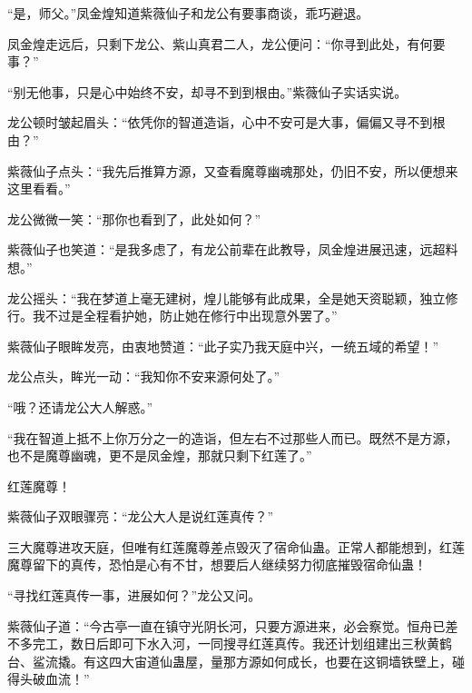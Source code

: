 \begin{this_body}
“是，师父。”凤金煌知道紫薇仙子和龙公有要事商谈，乖巧避退。

凤金煌走远后，只剩下龙公、紫山真君二人，龙公便问：“你寻到此处，有何要事？”

“别无他事，只是心中始终不安，却寻不到到根由。”紫薇仙子实话实说。

龙公顿时皱起眉头：“依凭你的智道造诣，心中不安可是大事，偏偏又寻不到根由？”

紫薇仙子点头：“我先后推算方源，又查看魔尊幽魂那处，仍旧不安，所以便想来这里看看。”

龙公微微一笑：“那你也看到了，此处如何？”

紫薇仙子也笑道：“是我多虑了，有龙公前辈在此教导，凤金煌进展迅速，远超料想。”

龙公摇头：“我在梦道上毫无建树，煌儿能够有此成果，全是她天资聪颖，独立修行。我不过是全程看护她，防止她在修行中出现意外罢了。”

紫薇仙子眼眸发亮，由衷地赞道：“此子实乃我天庭中兴，一统五域的希望！”

龙公点头，眸光一动：“我知你不安来源何处了。”

“哦？还请龙公大人解惑。”

“我在智道上抵不上你万分之一的造诣，但左右不过那些人而已。既然不是方源，也不是魔尊幽魂，更不是凤金煌，那就只剩下红莲了。”

红莲魔尊！

紫薇仙子双眼骤亮：“龙公大人是说红莲真传？”

三大魔尊进攻天庭，但唯有红莲魔尊差点毁灭了宿命仙蛊。正常人都能想到，红莲魔尊留下的真传，恐怕是心有不甘，想要后人继续努力彻底摧毁宿命仙蛊！

“寻找红莲真传一事，进展如何？”龙公又问。

紫薇仙子道：“今古亭一直在镇守光阴长河，只要方源进来，必会察觉。恒舟已差不多完工，数日后即可下水入河，一同搜寻红莲真传。我还计划组建出三秋黄鹤台、鲨流撬。有这四大宙道仙蛊屋，量那方源如何成长，也要在这铜墙铁壁上，碰得头破血流！”

\end{this_body}

